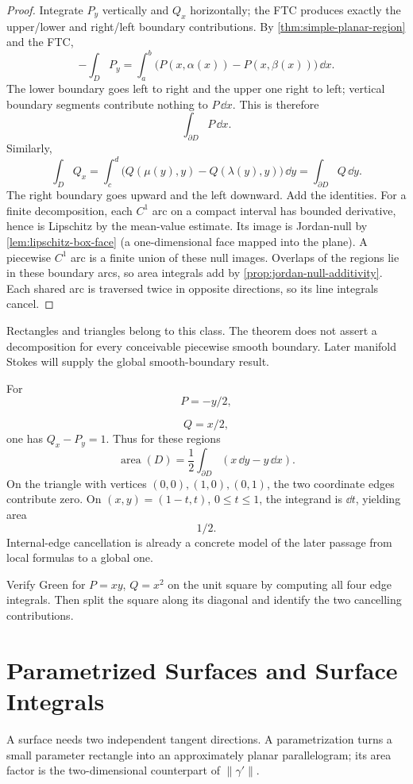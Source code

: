 \begin{proof}
Integrate $P_y$ vertically and $Q_x$ horizontally; the FTC
produces exactly the upper/lower and right/left boundary contributions.
By \cref{thm:simple-planar-region} and the FTC,
\[
-\int_D P_y=\int_a^b\bigl(P(x,\alpha(x))-P(x,\beta(x))\bigr)\,\dd x.
\]
The lower boundary goes left to right and the upper one right to left;
vertical boundary segments contribute nothing to $P\,\dd x$. This is
therefore
\[
\int_{\partial D}P\,\dd x.
\]
 Similarly,
\[
\int_D Q_x=\int_c^d\bigl(Q(\mu(y),y)-Q(\lambda(y),y)\bigr)\,\dd y
=\int_{\partial D}Q\,\dd y.
\]
The right boundary goes upward and the left downward. Add the identities.
For a finite decomposition, each $C^1$ arc on a compact interval has
bounded derivative, hence is Lipschitz by the mean-value estimate.
Its image is Jordan-null by \cref{lem:lipschitz-box-face} (a one-dimensional
face mapped into the plane). A piecewise $C^1$ arc is a finite union of
these null images. Overlaps of the regions lie in these boundary arcs,
so area integrals add by \cref{prop:jordan-null-additivity}. Each shared arc is
traversed twice in opposite directions, so its line integrals cancel.
\end{proof}
Rectangles and triangles belong to this class. The theorem does not assert
a decomposition for every conceivable piecewise smooth boundary. Later
manifold Stokes will supply the global smooth-boundary result.

\begin{example}
For
\[
P=-y/2,
\]

\[
Q=x/2,
\]
 one has $Q_x-P_y=1$. Thus for these regions
\[
\operatorname{area}(D)=\frac12\int_{\partial D}(x\,\dd y-y\,\dd x).
\]
On the triangle with vertices $(0,0),(1,0),(0,1)$, the two coordinate
edges contribute zero. On $(x,y)=(1-t,t)$, $0\leq t\leq1$, the integrand
is $\dd t$, yielding area
\[
1/2.
\]
 Internal-edge cancellation is already
a concrete model of the later passage from local formulas to a global one.
\end{example}
\begin{exercise}
Verify Green for $P=xy$, $Q=x^2$ on the unit square by computing all four
edge integrals. Then split the square along its diagonal and identify the
two cancelling contributions.
\end{exercise}

\section{Parametrized Surfaces and Surface Integrals}
A surface needs two independent tangent directions. A parametrization
turns a small parameter rectangle into an approximately planar parallelogram;
its area factor is the two-dimensional counterpart of $\|\gamma'\|$.

